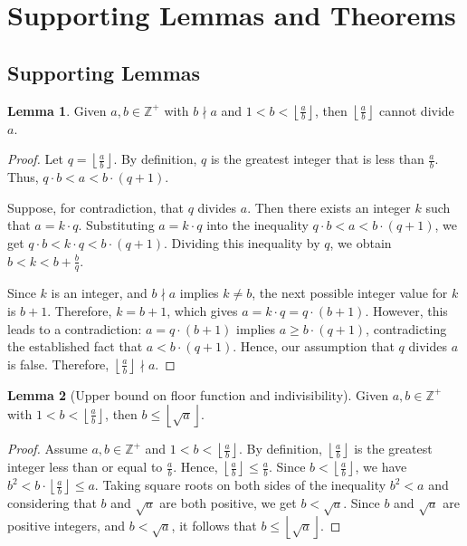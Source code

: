 \documentclass{article}
\theoremstyle{plain}
\theoremstyle{definition}
\newtheorem{lemma}{Lemma}
\newcommand{\Z}{\mathbb{Z}}
\begin{document}
\section{Supporting Lemmas and Theorems}

\subsection{Supporting Lemmas}
\begin{lemma} \label{lemma:floornondivisor}
Given $a,b \in \Z^{+}$ with \(b \nmid a\) and \( 1 < b < \left\lfloor \frac{a}{b} \right\rfloor \), then \(\left\lfloor \frac{a}{b} \right\rfloor \) cannot divide \(a\).
\end{lemma}
\begin{proof}
Let \(q = \left\lfloor \frac{a}{b} \right\rfloor\). By definition, \(q\) is the greatest integer that is less than \(\frac{a}{b}\). Thus, \(q \cdot b < a < b \cdot (q + 1)\).

Suppose, for contradiction, that \(q\) divides \(a\). Then there exists an integer \(k\) such that \(a = k \cdot q\). Substituting \(a = k \cdot q\) into the inequality \(q \cdot b < a < b \cdot (q + 1) \), we get \(q \cdot b < k \cdot q < b \cdot (q + 1) \). Dividing this inequality by \(q\), we obtain \(b < k < b + \frac{b}{q}\).

Since \(k\) is an integer, and \(b \nmid a\) implies \(k \neq b\), the next possible integer value for \(k\) is \(b + 1\). Therefore, \(k = b + 1\), which gives \(a = k \cdot q = q \cdot (b + 1)\). However, this leads to a contradiction: \(a = q \cdot (b + 1) \) implies \(a \geq b \cdot (q + 1) \), contradicting the established fact that \(a < b \cdot (q + 1) \). Hence, our assumption that \(q\) divides \(a\) is false. Therefore, \(\left\lfloor \frac{a}{b} \right\rfloor \nmid a\).
\end{proof}

\begin{lemma}[Upper bound on floor function and indivisibility]
\label{lemma:floornondivisorupperbound}
Given $a,b \in \Z^{+}$ with \( 1 < b < \left\lfloor \frac{a}{b} \right\rfloor \), then \(b \leq \left\lfloor \sqrt{a} \right\rfloor\).
\end{lemma}
\begin{proof}
Assume \( a, b \in \Z^{+} \) and \( 1 < b < \left\lfloor \frac{a}{b} \right\rfloor \). By definition, \( \left\lfloor \frac{a}{b} \right\rfloor \) is the greatest integer less than or equal to \( \frac{a}{b} \). Hence, \( \left\lfloor \frac{a}{b} \right\rfloor \leq \frac{a}{b} \). Since \( b < \left\lfloor \frac{a}{b} \right\rfloor \), we have \( b^2 < b \cdot \left\lfloor \frac{a}{b} \right\rfloor \leq a \). Taking square roots on both sides of the inequality \( b^2 < a \) and considering that \( b \) and \( \sqrt{a} \) are both positive, we get \( b < \sqrt{a} \). Since \( b \) and \( \sqrt{a} \) are positive integers, and \( b < \sqrt{a} \), it follows that \( b \leq \left\lfloor \sqrt{a} \right\rfloor \).
\end{proof}
\end{document}
